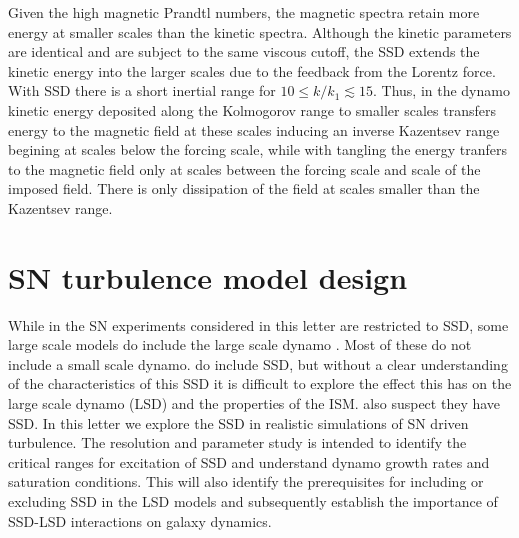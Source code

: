 \documentclass[preprint2]{aastex63}
\begin{document}
Given the high magnetic Prandtl numbers, the magnetic spectra retain more energy
at smaller scales than the kinetic spectra.
Although the kinetic parameters are identical and are subject to the same 
viscous cutoff, the SSD extends the kinetic energy into the larger scales
due to the feedback from the Lorentz force.
With SSD there is a short inertial range for $10\leq k/k_1\lesssim 15$.
Thus, in the dynamo kinetic energy deposited along the Kolmogorov range to
smaller scales transfers energy to the magnetic field at these scales
inducing an inverse Kazentsev range begining at scales below the forcing
scale, while with tangling the energy tranfers to the magnetic field
only at scales between the forcing scale and scale of the imposed field.
There is only dissipation of the field at scales smaller than the Kazentsev 
range.


\section{SN turbulence model design} \label{sec:model}

While in the SN experiments considered in this letter are restricted to
SSD, some large scale models do include the large scale dynamo
\citep[e.g.,][]{Gressel:2008,HWK09,WA09,Gent:2013b,EGSFB16,Pakmor17,SBADMN19,SDLMBP20,GE20}.
Most of these do not include a small scale dynamo.
\citet{Gent:2013b,EGSFB16} do include SSD, but without a clear understanding of
the characteristics of this SSD it is difficult to explore the effect this has
on the large scale dynamo (LSD) and the properties of the ISM.
\citet{SBADMN19,SDLMBP20} also suspect they have SSD.
In this letter we explore the SSD in realistic simulations of SN driven 
turbulence.
The resolution and parameter study is intended to identify the critical ranges
for excitation of SSD and understand dynamo growth rates and saturation 
conditions.
This will also identify the prerequisites for including or excluding SSD in the
LSD models and subsequently establish the importance of SSD-LSD interactions 
on galaxy dynamics. 
\end{document}
